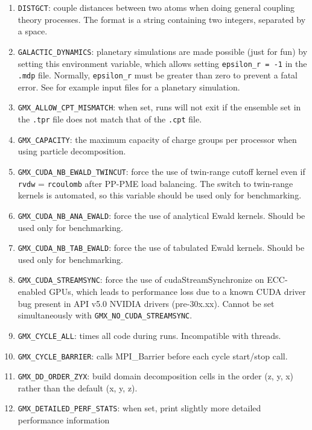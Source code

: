 \begin{enumerate}

\item   {\tt DISTGCT}: couple distances between two atoms when doing general coupling
        theory processes. The format is a string containing two integers, separated by a space.
\item   {\tt GALACTIC_DYNAMICS}: planetary simulations are made possible (just for fun) by setting
        this environment variable, which allows setting {\tt epsilon_r = -1} in the {\tt .mdp}
        file. Normally, {\tt epsilon_r} must be greater than zero to prevent a fatal error.
        See {\wwwpage} for example input files for a planetary simulation.
\item   {\tt GMX_ALLOW_CPT_MISMATCH}: when set, runs will not exit if the
        ensemble set in the {\tt .tpr} file does not match that of the
        {\tt .cpt} file.
\item   {\tt GMX_CAPACITY}: the maximum capacity of charge groups per
        processor when using particle decomposition.
\item   {\tt GMX_CUDA_NB_EWALD_TWINCUT}: force the use of twin-range cutoff kernel even if {\tt rvdw} =
        {\tt rcoulomb} after PP-PME load balancing. The switch to twin-range kernels is automated,
        so this variable should be used only for benchmarking.
\item   {\tt GMX_CUDA_NB_ANA_EWALD}: force the use of analytical Ewald kernels. Should be used only for benchmarking.
\item   {\tt GMX_CUDA_NB_TAB_EWALD}: force the use of tabulated Ewald kernels. Should be used only for benchmarking.
\item   {\tt GMX_CUDA_STREAMSYNC}: force the use of cudaStreamSynchronize on ECC-enabled GPUs, which leads
        to performance loss due to a known CUDA driver bug present in API v5.0 NVIDIA drivers (pre-30x.xx).
        Cannot be set simultaneously with {\tt GMX_NO_CUDA_STREAMSYNC}.
\item   {\tt GMX_CYCLE_ALL}: times all code during runs.  Incompatible with threads.
\item   {\tt GMX_CYCLE_BARRIER}: calls MPI_Barrier before each cycle start/stop call.
\item   {\tt GMX_DD_ORDER_ZYX}: build domain decomposition cells in the order
        (z, y, x) rather than the default (x, y, z).
\item   {\tt GMX_DETAILED_PERF_STATS}: when set, print slightly more detailed performance information

\end{enumerate}
